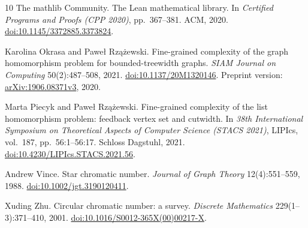 \documentclass[11pt]{article}
\theoremstyle{remark}
\begin{document}
\begin{thebibliography}{10}
The mathlib Community.
The Lean mathematical library.
In \emph{Certified Programs and Proofs (CPP 2020)}, pp.~367--381. ACM, 2020.
\href{https://doi.org/10.1145/3372885.3373824}{doi:10.1145/3372885.3373824}.

Karolina Okrasa and Pawe{\l} Rz\k{a}\.{z}ewski.
Fine-grained complexity of the graph homomorphism problem for bounded-treewidth graphs.
\emph{SIAM Journal on Computing} 50(2):487--508, 2021.
\href{https://doi.org/10.1137/20M1320146}{doi:10.1137/20M1320146}.
Preprint version: \href{https://arxiv.org/abs/1906.08371v3}{arXiv:1906.08371v3}, 2020.

Marta Piecyk and Pawe{\l} Rz\k{a}\.{z}ewski.
Fine-grained complexity of the list homomorphism problem: feedback vertex
set and cutwidth.
In \emph{38th International Symposium on Theoretical Aspects of Computer
Science (STACS 2021)}, LIPIcs, vol.~187, pp.~56:1--56:17.
Schloss Dagstuhl, 2021.
\href{https://doi.org/10.4230/LIPIcs.STACS.2021.56}{doi:10.4230/LIPIcs.STACS.2021.56}.

Andrew Vince. Star chromatic number.
\emph{Journal of Graph Theory} 12(4):551--559, 1988.
\href{https://doi.org/10.1002/jgt.3190120411}{doi:10.1002/jgt.3190120411}.

Xuding Zhu.
Circular chromatic number: a survey.
\emph{Discrete Mathematics} 229(1--3):371--410, 2001.
\href{https://doi.org/10.1016/S0012-365X(00)00217-X}{doi:10.1016/S0012-365X(00)00217-X}.
\end{thebibliography}
\end{document}

